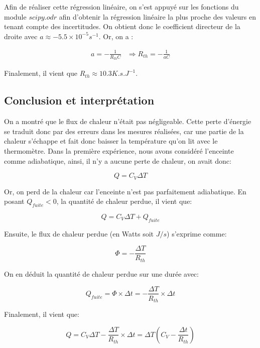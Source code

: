 \documentclass[12pt]{article}
\begin{document}
\newpage

Afin de réaliser cette régression linéaire, on s'est appuyé sur les fonctions du module $scipy.odr$ 
afin d'obtenir la régression linéaire la plus proche des valeurs en tenant compte des incertitudes. On obtient donc le coefficient directeur
de la droite avec $a \approx -5.5 \times 10^{-5}s^{-1}$. Or, on a :

\begin{align}
	a = - \frac{1}{R_{th} C} & \Rightarrow R_{th} = - \frac{1}{aC} 
\end{align}

Finalement, il vient que $R_{th} \approx 10.3 K.s.J^{-1}$.

\subsection{Conclusion et interprétation}
On a montré que le flux de chaleur n'était pas négligeable. Cette perte d'énergie se traduit donc par des erreurs dans les mesures réalisées, car une partie de la chaleur s'échappe et fait donc baisser la température qu'on lit
avec le thermomètre. Dans la première expérience, nous avons considéré l'enceinte comme adiabatique, ainsi, il n'y a aucune perte de chaleur, on avait donc:

\begin{equation}
	Q = C_V \Delta T
\end{equation}

Or, on perd de la chaleur car l'enceinte n'est pas parfaitement adiabatique. En posant $Q_{fuite} < 0$, la quantité de chaleur perdue, il vient que:

\begin{equation}
	Q = C_V \Delta T + Q_{fuite}
\end{equation}

Ensuite, le flux de chaleur perdue (en Watts soit $J/s$) s'exprime comme:

\begin{equation}
	\Phi = - \frac{\Delta T}{R_{th}}
\end{equation}

On en déduit la quantité de chaleur perdue sur une durée avec:

\begin{equation}
	Q_{fuite} = \Phi \times \Delta t = - \frac{\Delta T}{R_{th}} \times \Delta t
\end{equation}

Finalement, il vient que:

\begin{equation}
	Q = C_V \Delta T - \frac{\Delta T}{R_{th}} \times \Delta t = \Delta T \left( C_V - \frac{\Delta t}{R_{th}} \right)
\end{equation}
\end{document}
